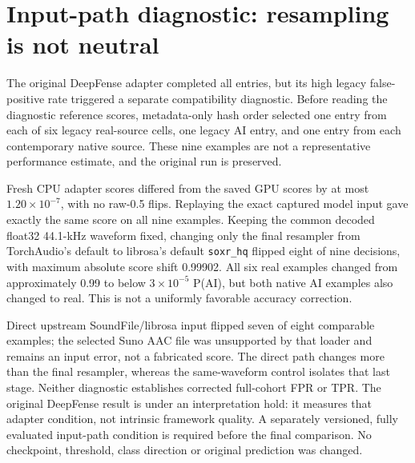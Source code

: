 \documentclass[10pt,a4paper]{article}
\begin{document}
\section{Input-path diagnostic: resampling is not neutral}

The original DeepFense adapter completed all entries, but its high legacy
false-positive rate triggered a separate compatibility diagnostic. Before
reading the diagnostic reference scores, metadata-only hash order selected
one entry from each of six legacy real-source cells, one legacy AI entry,
and one entry from each contemporary native source. These nine examples are
not a representative performance estimate, and the original run is preserved.

Fresh CPU adapter scores differed from the saved GPU scores by at most
$1.20\times10^{-7}$, with no raw-0.5 flips. Replaying the exact captured model
input gave exactly the same score on all nine examples. Keeping the common
decoded float32 44.1-kHz waveform fixed, changing only the final resampler from
TorchAudio's default to librosa's default \texttt{soxr\_hq} flipped eight of
nine decisions, with maximum absolute score shift 0.99902. All six real
examples changed from approximately 0.99 to below $3\times10^{-5}$ P(AI), but
both native AI examples also changed to real. This is not a uniformly
favorable accuracy correction.

Direct upstream SoundFile/librosa input flipped seven of eight comparable
examples; the selected Suno AAC file was unsupported by that loader and remains
an input error, not a fabricated score. The direct path changes more than the
final resampler, whereas the same-waveform control isolates that last stage.
Neither diagnostic establishes corrected full-cohort FPR or TPR. The original
DeepFense result is under an interpretation hold: it measures that adapter
condition, not intrinsic framework quality. A separately versioned, fully
evaluated input-path condition is required before the final comparison. No
checkpoint, threshold, class direction or original prediction was changed.
\end{document}
